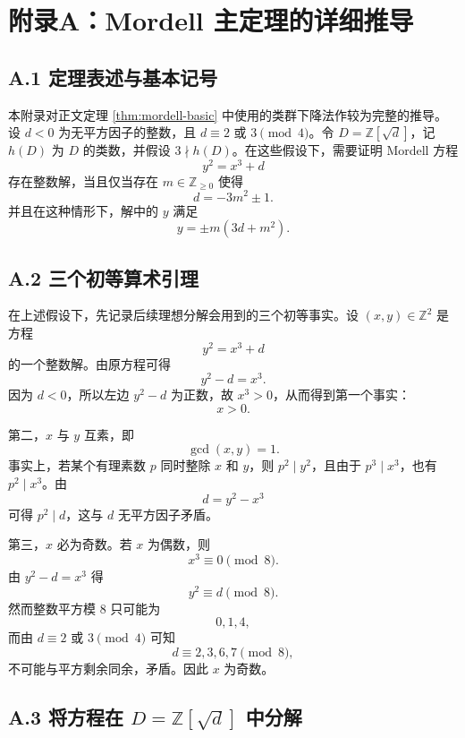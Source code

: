 \newpage
{}
\section*{附录A：Mordell 主定理的详细推导}
\begingroup
\setlength{\parindent}{0pt}
\setlength{\parskip}{0.35\baselineskip}

\subsection*{A.1 定理表述与基本记号}

本附录对正文定理 \ref{thm:mordell-basic} 中使用的类群下降法作较为完整的推导。设 \(d<0\) 为无平方因子的整数，且 \(d\equiv 2\) 或 \(3\pmod 4\)。令 \(D=\mathbb Z[\sqrt d]\)，记 \(h(D)\) 为 \(D\) 的类数，并假设 \(3\nmid h(D)\)。在这些假设下，需要证明 Mordell 方程
\[
    y^2=x^3+d
\]
存在整数解，当且仅当存在 \(m\in\mathbb Z_{\ge0}\) 使得
\[
    d=-3m^2\pm 1.
\]
并且在这种情形下，解中的 \(y\) 满足
\[
    y=\pm m(3d+m^2).
\]

\subsection*{A.2 三个初等算术引理}

在上述假设下，先记录后续理想分解会用到的三个初等事实。设 \((x,y)\in\mathbb Z^2\) 是方程
\[
    y^2=x^3+d
\]
的一个整数解。由原方程可得
\[
    y^2-d=x^3.
\]
因为 \(d<0\)，所以左边 \(y^2-d\) 为正数，故 \(x^3>0\)，从而得到第一个事实：
\[
    x>0.
\]

第二，\(x\) 与 \(y\) 互素，即
\[
    \gcd(x,y)=1.
\]
事实上，若某个有理素数 \(p\) 同时整除 \(x\) 和 \(y\)，则 \(p^2\mid y^2\)，且由于 \(p^3\mid x^3\)，也有 \(p^2\mid x^3\)。由
\[
    d=y^2-x^3
\]
可得 \(p^2\mid d\)，这与 \(d\) 无平方因子矛盾。

第三，\(x\) 必为奇数。若 \(x\) 为偶数，则
\[
    x^3\equiv 0 \pmod 8.
\]
由 \(y^2-d=x^3\) 得
\[
    y^2\equiv d \pmod 8.
\]
然而整数平方模 \(8\) 只可能为
\[
    0,1,4,
\]
而由 \(d\equiv2\) 或 \(3\pmod4\) 可知
\[
    d\equiv 2,3,6,7 \pmod8,
\]
不可能与平方剩余同余，矛盾。因此 \(x\) 为奇数。

\subsection*{A.3 将方程在 \(D=\mathbb Z[\sqrt d]\) 中分解}

